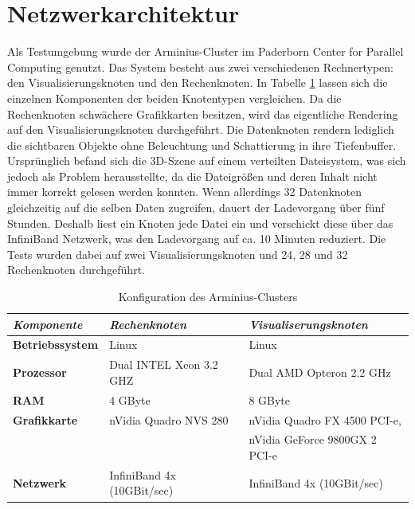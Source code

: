 \section{Netzwerkarchitektur}
\label{sec:impl:netzwerkarchitektur}
Als Testumgebung wurde der Arminius-Cluster im Paderborn Center for Parallel Computing \cite{pc2} genutzt. Das System besteht aus zwei verschiedenen Rechnertypen: den Visualisierungsknoten und den Rechenknoten. In Tabelle \ref{tab:impl:arminius} lassen sich die einzelnen Komponenten der beiden Knotentypen vergleichen. Da die Rechenknoten schwächere Grafikkarten besitzen, wird das eigentliche Rendering auf den Visualisierungsknoten durchgeführt. Die Datenknoten rendern lediglich die sichtbaren Objekte ohne Beleuchtung und Schattierung in ihre Tiefenbuffer.\\
Ursprünglich befand sich die 3D-Szene auf einem verteilten Dateisystem, was sich jedoch als Problem herausstellte, da die Dateigrößen und deren Inhalt nicht immer korrekt gelesen werden konnten. Wenn allerdings 32 Datenknoten gleichzeitig auf die selben Daten zugreifen, dauert der Ladevorgang über fünf Stunden. Deshalb liest ein Knoten jede Datei ein und verschickt diese über das InfiniBand Netzwerk, was den Ladevorgang auf ca. 10 Minuten reduziert. Die Tests wurden dabei auf zwei Visualisierungsknoten und 24, 28 und 32 Rechenknoten durchgeführt.

\begin{table}
 \centering
 \begin{tabular}{lll} %
  \toprule %
  \textit{Komponente} & \textit{Rechenknoten} & \textit{Visualiserungsknoten} \\
  \midrule
  \textbf{Betriebssystem} & Linux & Linux \\
  \textbf{Prozessor} & Dual INTEL Xeon 3.2 GHZ & Dual AMD Opteron 2.2 GHz \\
  \textbf{RAM} & 4 GByte & 8 GByte \\
  \textbf{Grafikkarte} & nVidia Quadro NVS 280 & nVidia Quadro FX 4500 PCI-e, \\
  \;&\;& nVidia GeForce 9800GX 2 PCI-e \\
  \textbf{Netzwerk} & InfiniBand 4x (10GBit/sec) & InfiniBand 4x (10GBit/sec) \\
  \bottomrule
 \end{tabular} 
 \caption{Konfiguration des Arminius-Clusters}
 \label{tab:impl:arminius}
\end{table}

